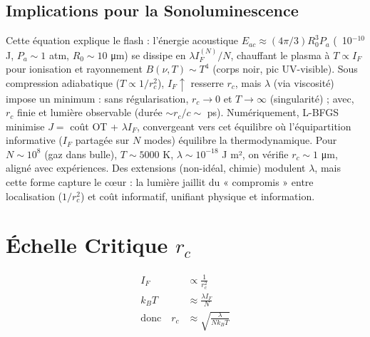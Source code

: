 \documentclass[a4paper,12pt]{article}
\begin{document}
\subsection{Implications pour la Sonoluminescence}
Cette équation explique le flash : l'énergie acoustique \( E_{ac} \approx (4 \pi / 3) R_0^3 P_a \) (~10\(^{-10}\) J, \( P_a \sim 1 \) atm, \( R_0 \sim 10 \) μm) se dissipe en \(\lambda I_F^{(N)} / N\), chauffant le plasma à \( T \propto I_F \) pour ionisation et rayonnement \( B(\nu, T) \sim T^4 \) (corps noir, pic UV-visible). Sous compression adiabatique (\( T \propto 1 / r_c^2 \)), \( I_F \uparrow \) resserre \( r_c \), mais \(\lambda\) (via viscosité) impose un minimum : sans régularisation, \( r_c \rightarrow 0 \) et \( T \rightarrow \infty \) (singularité) ; avec, \( r_c \) finie et lumière observable (durée \(\sim r_c / c \sim\) ps). Numériquement, L-BFGS minimise \( J = \) coût OT + \(\lambda I_F\), convergeant vers cet équilibre où l'équipartition informative (\( I_F \) partagée sur \( N \) modes) équilibre la thermodynamique. Pour \( N \sim 10^8 \) (gaz dans bulle), \( T \sim 5000 \) K, \(\lambda \sim 10^{-18}\) J m², on vérifie \( r_c \sim 1 \) μm, aligné avec expériences. Des extensions (non-idéal, chimie) modulent \(\lambda\), mais cette forme capture le cœur : la lumière jaillit du « compromis » entre localisation (\( 1 / r_c^2 \)) et coût informatif, unifiant physique et information.
\newpage
\section{Échelle Critique \( r_c \)}

\begin{equation}
\boxed{
\begin{aligned}
I_F &\propto \frac{1}{r_c^2} \\
k_B T &\approx \frac{\lambda I_F}{N} \\
\text{donc} \quad r_c &\approx \sqrt{\frac{\lambda}{N k_B T}}
\end{aligned}
}
\end{equation}
\label{eq:if-t-rc}
\end{document}

